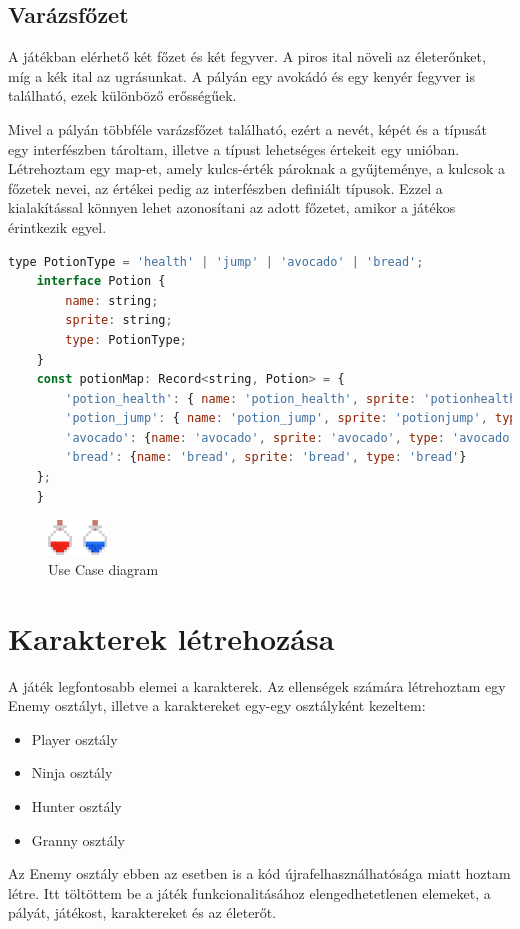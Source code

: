 \documentclass[12pt, a4paper]{report}
\theoremstyle{definition}
\begin{document}
	\subsection{Varázsfőzet}
	A játékban elérhető két főzet és két fegyver. A piros ital növeli az életerőnket, míg a kék ital az ugrásunkat. A pályán egy avokádó és egy kenyér fegyver is található, ezek különböző erősségűek. 
	
	Mivel a pályán többféle varázsfőzet található, ezért a nevét, képét és a típusát egy interfészben tároltam, illetve a típust lehetséges értekeit egy unióban. Létrehoztam egy map-et, amely kulcs-érték pároknak a gyűjteménye, a kulcsok a főzetek nevei, az értékei pedig az interfészben definiált típusok. Ezzel a kialakítással könnyen lehet azonosítani az adott főzetet, amikor a játékos érintkezik egyel.
	\begin{lstlisting}[language=JavaScript]
	type PotionType = 'health' | 'jump' | 'avocado' | 'bread';
	interface Potion {
		name: string;
		sprite: string;
		type: PotionType;
	}
	const potionMap: Record<string, Potion> = {
		'potion_health': { name: 'potion_health', sprite: 'potionhealth', type: 'health' },
		'potion_jump': { name: 'potion_jump', sprite: 'potionjump', type: 'jump' },
		'avocado': {name: 'avocado', sprite: 'avocado', type: 'avocado'},
		'bread': {name: 'bread', sprite: 'bread', type: 'bread'}
	};
	}
	\end{lstlisting}
	\begin{figure}[!h]
		\centering
		\includegraphics[width=0.2\linewidth]{./images/potions.png}
		\caption{Use Case diagram}
		\label{fig:usecase}
	\end{figure}
	\section{Karakterek létrehozása}
	A játék legfontosabb elemei a karakterek. Az ellenségek számára létrehoztam egy Enemy osztályt, illetve a karaktereket egy-egy osztályként kezeltem:
	\begin{itemize} 
		\item Player osztály
		\item Ninja osztály
		\item Hunter osztály
		\item Granny osztály
	\end{itemize}
	Az Enemy osztály ebben az esetben is a kód újrafelhasználhatósága miatt hoztam létre. Itt töltöttem be a játék funkcionalitásához elengedhetetlenen elemeket, a pályát, játékost, karaktereket és az életerőt.
	
\end{document}
